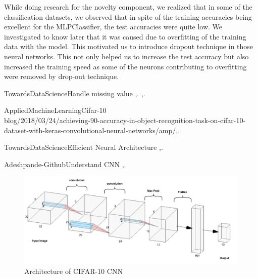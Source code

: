\documentclass[10pt,twocolumn,letterpaper]{article}
\begin{document}
While doing research for the novelty component, we realized that in some of the classification datasets, we observed that in spite of the training accuracies being excellent for the MLPClassifier, the test accuracies were quite low. We investigated to know later that it was caused due to overfitting of the training data with the model. This motivated us to introduce dropout technique in those neural networks. This not only helped us to increase the test accuracy but also increased the training speed as some of the neurons contributing to overfitting were removed by drop-out technique.

\begin{thebibliography}{10}

TowardsDataScience\newblock Handle missing value
,.
,.

AppliedMachineLearning\newblock Cifar-10
\\{blog/2018/03/24/achieving-90-accuracy-in-object-recognition-task-on-cifar-10-dataset-with-keras-convolutional-neural-networks/amp/},.

TowardsDataScience\newblock Efficient Neural Architecture
,.

Adeshpande-Github\newblock Understand CNN
,.

\end{thebibliography}

\appendix
\begin{figure}
   \begin{center}
   \includegraphics[width=\linewidth]{CNN_CIFAR10.PNG}
   
   \end{center}
     \caption{Architecture of CIFAR-10 CNN\label{fourth_figure}} 
\end{figure}
\end{document}
